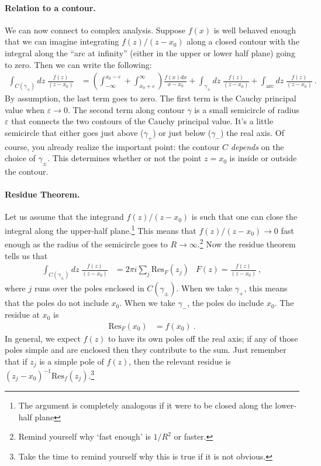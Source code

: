 
\paragraph{Relation to a contour.} We can now connect to complex analysis. Suppose $f(x)$ is well behaved enough that we can imagine integrating $f(z)/(z-x_0)$ along a closed contour with the integral along the ``arc at infinity'' (either in the upper or lower half plane) going to zero. Then we can write the following:
\begin{align}
	\int_{C(\gamma_\pm)} dz \; \frac{f(z)}{(z-x_0)} &= 
	\left(\int_{-\infty}^{x_0-\varepsilon} 
	 	 	+
	 	 	\int_{x_0+\varepsilon}^\infty\right)  \frac{f(x) dx}{x-x_0}
	+
	\int_{\gamma_\pm} dz \; \frac{f(z)}{(z-x_0)}
	+
	\int_{\text{arc}} dz \; \frac{f(z)}{(z-x_0)} \ .
	\label{eq:cauchy:contour}
\end{align}
By assumption, the last term goes to zero. The first term is the Cauchy principal value when $\varepsilon\to 0$. The second term along contour $\gamma$ is a small semicircle of radius $\varepsilon$ that connects the two contours of the Cauchy principal value. It's a little semicircle that either goes just above ($\gamma_+$) or just below ($\gamma_-$) the real axis. Of course, you already realize the important point: the contour $C$ \emph{depends} on the choice of $\gamma_\pm$. This determines whether or not the point $z=x_0$ is inside or outside the contour.

\paragraph{Residue Theorem.} Let us assume that the integrand $f(z)/(z-x_0)$ is such that one can close the integral along the upper-half plane.\footnote{The argument is completely analogous if it were to be closed along the lower-half plane} This means that $f(z)/(z-x_0) \to 0$ fast enough as the radius of the semicircle goes to $R\to \infty$.\footnote{Remind yourself why `fast enough' is $1/R^2$ or faster.} Now the residue theorem tells us that
\begin{align}
	\int_{C(\gamma_\pm)} dz \; \frac{f(z)}{(z-x_0)} &= 2\pi i \sum_j \text{Res}_F(z_j)
	&
	F(z) = \frac{f(z)}{(z-x_0)} \ ,
\end{align}
where $j$ runs over the poles enclosed in $C(\gamma_\pm)$. When we take $\gamma_+$, this means that the poles do not include $x_0$. When we take $\gamma_-$, the poles do include $x_0$. The residue at $x_0$ is
\begin{align}
 	\text{Res}_F(x_0) &= f(x_0) \ .
\end{align}
In general, we expect $f(z)$ to have its own poles off the real axis; if any of those poles simple and are enclosed then they contribute to the sum. Just remember that if $z_j$ is a simple pole of $f(z)$, then the relevant residue is $(z_j-x_0)^{-1}\text{Res}_f(z_j)$.\footnote{Take the time to remind yourself why this is true if it is not obvious.}

